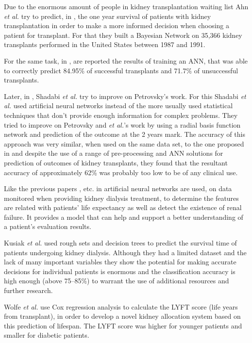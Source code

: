 Due to the enormous amount of people in kidney transplantation waiting list Ahn \emph{et al.} try to predict, in \cite{Ahn2000}, the 
one year survival of patients with kidney transplantation in order to make a more informed decision when choosing a patient for 
transplant. For that they built a Bayesian Network on 35,366 kidney transplants performed in the United States between 1987 and 1991.

For the same task, in \cite{Petrovsky2002}, are reported the results of training an ANN, that was able to correctly predict 84.95\% 
of successful transplants and 71.7\% of unsuccessful transplants.

Later, in \cite{Shadabi2004}, Shadabi \emph{et al.} try to improve on Petrovsky’s work. For this Shadabi \emph{et al.} used
 artificial neural networks instead of the more usually used statistical techniques that don’t provide enough information for complex
 problems. They tried to improve on Petrovsky and \emph{et al.}’s work by using a radial basis function network and prediction of the outcome
 at the 2 years mark. The accuracy of this approach was very similar, when used on the same data set, to the one proposed in 
 \cite{Petrovsky2002} and despite the use of a range of pre-processing and ANN solutions for prediction of outcomes of 
 kidney transplants, they found that the resultant accuracy of approximately 62\% was probably too low to be of any clinical use. 

Like the previous papers \cite{Shadabi2004}, etc. in \cite{Osofisan2011} artificial 
neural networks are used, on data monitored when providing kidney dialysis treatment, to determine the features are related with
 patients’ life expectancy as well as detect the existence of renal failure. It provides a model that can help and support a better 
 understanding of a patient’s evaluation results.

Kusiak \emph{et al.} \cite{Kusiak2005} used rough sets and decision trees to predict the survival time of patients undergoing
 kidney dialysis. Although they had a limited dataset and the lack of many important variables they show the potential for making 
 accurate decisions for individual patients is enormous and the classification accuracy is high enough (above 75–85\%) to warrant the
 use of additional resources and further research.

Wolfe \emph{et al.} \cite{Wolfe2008} use Cox regression analysis to calculate the LYFT score (life years from transplant), in order
 to develop a novel kidney allocation system based on this prediction of lifespan. The LYFT score was higher for younger patients and 
 smaller for diabetic patients.

